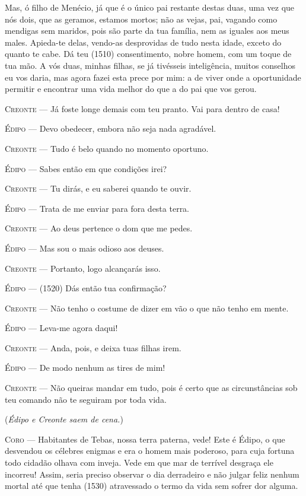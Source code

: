 Mas, ó filho de Menécio, já que é o único pai restante destas duas, uma
vez que nós dois, que as geramos, estamos mortos; não as vejas, pai,
vagando como mendigas sem maridos, pois são parte da tua família, nem as
iguales aos meus males. Apieda-te delas, vendo-as desprovidas de tudo
nesta idade, exceto do quanto te cabe. Dá teu (1510) consentimento,
nobre homem, com um toque de tua mão. A vós duas, minhas filhas, se já
tivésseis inteligência, muitos conselhos eu vos daria, mas agora fazei
esta prece por mim: a de viver onde a oportunidade permitir e encontrar
uma vida melhor do que a do pai que vos gerou.

\textsc{Creonte} --- Já foste longe demais com teu pranto. Vai para dentro de casa!

\textsc{Édipo} --- Devo obedecer, embora não seja nada agradável.

\textsc{Creonte} --- Tudo é belo quando no momento oportuno.

\textsc{Édipo} --- Sabes então em que condições irei?

\textsc{Creonte} --- Tu dirás, e eu saberei quando te ouvir.

\textsc{Édipo} --- Trata de me enviar para fora desta terra.

\textsc{Creonte} --- Ao deus pertence o dom que me pedes.

\textsc{Édipo} --- Mas sou o mais odioso aos deuses.

\textsc{Creonte} --- Portanto, logo alcançarás isso.

\textsc{Édipo} --- (1520) Dás então tua confirmação?

\textsc{Creonte} --- Não tenho o costume de dizer em vão o que não tenho em mente.

\textsc{Édipo} --- Leva-me agora daqui!

\textsc{Creonte} --- Anda, pois, e deixa tuas filhas irem.

\textsc{Édipo} --- De modo nenhum as tires de mim!

\textsc{Creonte} --- Não queiras mandar em tudo, pois é certo que as circunstâncias sob teu
comando não te seguiram por toda vida.

(\emph{Édipo e Creonte saem de cena.})

\textsc{Coro} --- Habitantes de Tebas, nossa terra paterna, vede! Este é Édipo, o que
desvendou os célebres enigmas e era o homem mais poderoso, para cuja
fortuna todo cidadão olhava com inveja. Vede em que mar de terrível
desgraça ele incorreu! Assim, seria preciso observar o dia derradeiro e
não julgar feliz nenhum mortal até que tenha (1530) atravessado o termo
da vida sem sofrer dor alguma.


